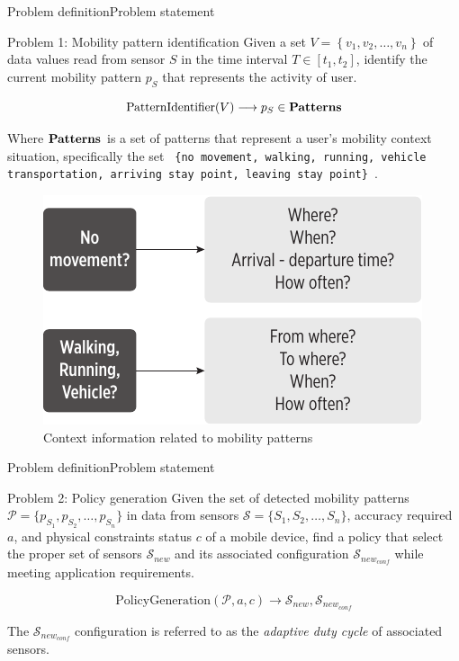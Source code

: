 \documentclass[10pt,xcolor={dvipsnames}]{beamer}
\begin{document}
\begin{frame}{Problem definition}{Problem statement}
\begin{alertblock}{Problem 1: Mobility pattern identification}
\small
Given a set $V = \left\{v_{1}, v_{2}, \dotsc, v_{n}\right\}$ of data values read from sensor $S$ in the time interval $T  \in [t_{1}, t_{2}]$, identify the current mobility pattern $p_{S}$ that represents the activity of user.

\begin{equation}
  \text{PatternIdentifier}( V ) \longrightarrow{} p_{S} \in \text{\textbf{Patterns}}
\end{equation}

Where $\text{\textbf{Patterns}}$ is a set of patterns that represent a user's mobility context situation, specifically the set \scriptsize{\texttt{ \{no movement, walking, running, vehicle transportation, arriving stay point, leaving stay point\} }}.
\pause
\begin{figure}[tb]
  \centering
  \includegraphics[scale=0.55]{vectors/mobility-patterns-implications}
  \caption{Context information related to mobility patterns}
  \label{fig:mobility-patterns-implications}
\end{figure}
\end{alertblock}
\end{frame}

\begin{frame}{Problem definition}{Problem statement}
\begin{alertblock}{Problem 2: Policy generation}
\small
Given the set of detected mobility patterns $\mathcal{P} = \{ p_{S_1}, p_{S_2}, \ldots, p_{S_n} \}$ in data from sensors $\mathcal{S} = \{ S_1,S_2,\ldots, S_n \}$, accuracy required $a$, and physical constraints status $c$ of a mobile device, find a policy that select the proper set of sensors $\mathcal{S}_{new}$ and its associated configuration $\mathcal{S}_{new_{conf}}$  while meeting application requirements.

\begin{equation}
  \text{PolicyGeneration}( \mathcal{P}, a, c ) \longrightarrow{} \mathcal{S}_{new}, \mathcal{S}_{new_{conf}}
\end{equation}

The $\mathcal{S}_{new_{conf}}$ configuration is referred to as the \emph{adaptive duty cycle} of associated sensors.
\end{alertblock}
\end{frame}
\end{document}
